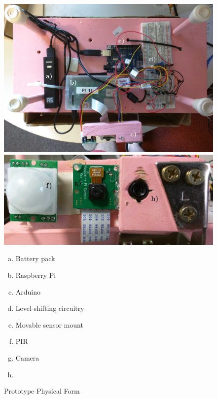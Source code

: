 \begin{figure}[H]
\centering
\includegraphics[width=\textwidth]{../diagrams/prototypeb-1.jpg}
\includegraphics[width=\textwidth]{../diagrams/prototypeb-2.jpg}
{\small
\begin{multicols}{2}
\begin{enumerate}[a)]
 \item Battery pack
 \item Raspberry Pi
 \item Arduino
 \item Level-shifting circuitry
 \item Movable sensor mount
 \item PIR
 \item Camera
 \item \mlx
\end{enumerate}
\end{multicols}
}
\caption{Prototype Physical Form}
\label{fig:pictures:protob1}
\end{figure}

